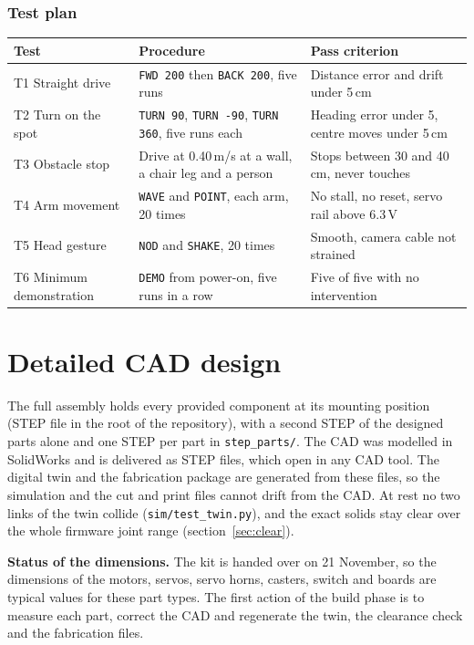 \documentclass[11pt,a4paper]{article}
\newcommand{\file}[1]{{\small\nolinkurl{#1}}}
\renewcommand{\deg}{\textdegree}
\begin{document}
\subsubsection*{Test plan}\label{sec:tests}
\begin{table}[H]\small
\begin{tabularx}{\linewidth}{@{}P{30mm}LP{56mm}@{}}
\toprule
\textbf{Test} & \textbf{Procedure} & \textbf{Pass criterion}\\
\midrule
T1 Straight drive & \texttt{FWD 200} then \texttt{BACK 200}, five runs & Distance error and drift under 5\,cm\\
T2 Turn on the spot & \texttt{TURN 90}, \texttt{TURN -90}, \texttt{TURN 360}, five runs each & Heading error under 5\deg, centre moves under 5\,cm\\
T3 Obstacle stop & Drive at 0.40\,m/s at a wall, a chair leg and a person & Stops between 30 and 40\,cm, never touches\\
T4 Arm movement & \texttt{WAVE} and \texttt{POINT}, each arm, 20 times & No stall, no reset, servo rail above 6.3\,V\\
T5 Head gesture & \texttt{NOD} and \texttt{SHAKE}, 20 times & Smooth, camera cable not strained\\
T6 Minimum demonstration & \texttt{DEMO} from power-on, five runs in a row & Five of five with no intervention\\
\bottomrule
\end{tabularx}
\end{table}

\clearpage
\section{Detailed CAD design}\label{sec:cad}
The full assembly holds every provided component at its mounting position (STEP file in the root of the repository), with a second STEP of the designed parts alone and one STEP per part in \file{step_parts/}. The CAD was modelled in SolidWorks and is delivered as STEP files, which open in any CAD tool. The digital twin and the fabrication package are generated from these files, so the simulation and the cut and print files cannot drift from the CAD. At rest no two links of the twin collide (\file{sim/test_twin.py}), and the exact solids stay clear over the whole firmware joint range (section~\ref{sec:clear}).

\begin{keybox}
\textbf{Status of the dimensions.} The kit is handed over on 21 November, so the dimensions of the motors, servos, servo horns, casters, switch and boards are typical values for these part types. The first action of the build phase is to measure each part, correct the CAD and regenerate the twin, the clearance check and the fabrication files.
\end{keybox}
\end{document}
